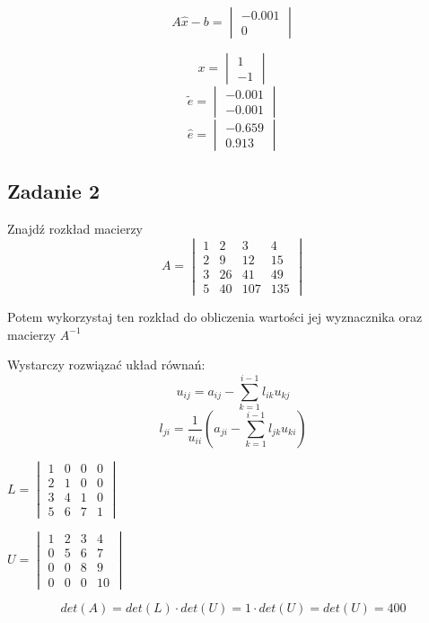 \documentclass[a4paper]{article}
\begin{document}
$$A\widehat{x}-b =
\begin{vmatrix}
-0.001\\
0
\end{vmatrix}$$

$$x =
\begin{vmatrix}
 1\\
-1
\end{vmatrix}
$$
$$\widetilde{e} =
\begin{vmatrix}
-0.001\\
-0.001
\end{vmatrix}
$$
$$\widehat{e} =
\begin{vmatrix}
-0.659\\
0.913
\end{vmatrix}$$

\clearpage
\subsection*{Zadanie 2}
Znajdź rozkład macierzy 
$$A=\begin{vmatrix}
1 & 2 & 3 & 4\\
2 & 9 & 12 & 15\\
3 & 26 & 41 & 49\\
5 & 40 & 107 & 135
\end{vmatrix}$$

Potem wykorzystaj ten rozkład do obliczenia wartości jej wyznacznika oraz macierzy $A^{-1}$

Wystarczy rozwiązać układ równań:\\
$$u_{ij} = a_{ij} - \sum\limits_{k=1}^{i-1} l_{ik}u_{kj}$$
$$l_{ji} = \frac{1}{u_{ii}} (a_{ji}- \sum\limits_{k=1}^{i-1} l_{jk}u_{ki})$$

$L=\begin{vmatrix}
1 & 0 & 0 & 0\\
2 & 1 & 0 & 0\\
3 & 4 & 1 & 0\\
5 & 6 & 7 & 1
\end{vmatrix}$

$U=\begin{vmatrix}
1 & 2 & 3 & 4\\
0 & 5 & 6 & 7\\
0 & 0 & 8 & 9\\
0 & 0 & 0 & 10
\end{vmatrix}$

$$det(A)=det(L)\cdot det(U) = 1\cdot det(U) = det(U)=400 $$
\end{document}
